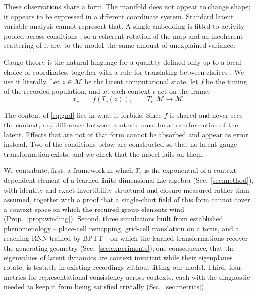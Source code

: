 \documentclass{article}
\theoremstyle{plain}
\newcommand{\Mfd}{\mathcal{M}}
\begin{document}
These observations share a form. The manifold does not appear to change shape;
it appears to be expressed in a different coordinate system. Standard latent
variable analysis cannot represent that. A single embedding is fitted to
activity pooled across conditions
\citep{cunningham2014dimensionality,gallego2017neural}, so a coherent rotation of
the map and an incoherent scattering of it are, to the model, the same amount of
unexplained variance.

Gauge theory is the natural language for a quantity defined only up to a local
choice of coordinates, together with a rule for translating between choices
\citep{kobayashi1963foundations,nakahara2003geometry}. We use it literally. Let
$z \in \Mfd$ be the latent computational state, let $f$ be the tuning of the
recorded population, and let each context $c$ act on the frame:
\begin{equation}
  x_c \;=\; f\!\left(T_c(z)\right), \qquad T_c : \Mfd \to \Mfd .
  \label{eq:gnd}
\end{equation}

The content of \eqref{eq:gnd} lies in what it forbids. Since $f$ is shared and
never sees the context, any difference between contexts must be a transformation
of the latent. Effects that are not of that form cannot be absorbed and appear
as error instead. Two of the conditions below are constructed so that no latent
gauge transformation exists, and we check that the model fails on them.

We contribute, first, a framework in which $T_c$ is the exponential of a
context-dependent element of a learned finite-dimensional Lie algebra
(Sec.~\ref{sec:method}), with identity and exact invertibility structural and
closure measured rather than assumed, together with a proof that a single-chart
field of this form cannot cover a context space on which the required group
elements wind (Prop.~\ref{prop:winding}). Second, three simulations built from
established phenomenology -- place-cell remapping, grid-cell translation on a
torus, and a reaching RNN trained by BPTT -- on which the learned transformations
recover the generating geometry (Sec.~\ref{sec:experiments}); one consequence,
that the eigenvalues of latent dynamics are context invariant while their
eigenplanes rotate, is testable in existing recordings without fitting our model.
Third, four metrics for representational consistency across contexts, each with
the diagnostic needed to keep it from being satisfied trivially
(Sec.~\ref{sec:metrics}).

\end{document}
